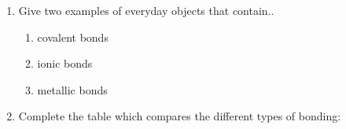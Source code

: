         \label{m38694*id143111}\begin{enumerate}[noitemsep, label=\textbf{\arabic*}. ] 
            \label{m38694*uid86}\item Give two examples of everyday objects that contain..
\label{m38694*id143127}\begin{enumerate}[noitemsep, label=\textbf{\alph*}. ] 
            \label{m38694*uid87}\item covalent bonds
\label{m38694*uid88}\item ionic bonds
\label{m38694*uid89}\item metallic bonds
\end{enumerate}
                \label{m38694*uid90}\item Complete the table which compares the different types of bonding:

    
      
    
    \setlength\mytablespace{8\tabcolsep}
    \addtolength\mytablespace{5\arrayrulewidth}
    \setlength\mytablewidth{\linewidth}
        
    
    \setlength\mytableroom{\mytablewidth}
    \addtolength\mytableroom{-\mytablespace}
    
    \setlength\myfixedwidth{0pt}
    \setlength\mystarwidth{\mytableroom}
        \addtolength\mystarwidth{-\myfixedwidth}
        \divide{}
        
    
\end{enumerate}
